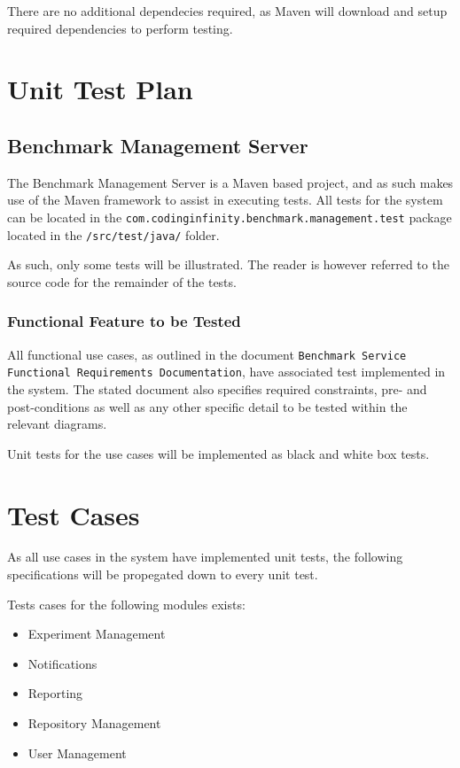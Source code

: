 \documentclass[11pt,a4paper]{article}
\begin{document}
There are no additional dependecies required, as Maven will download and setup
required dependencies to perform testing.

\section{Unit Test Plan}
\subsection{Benchmark Management Server}
\label{sec:benchmarkManagementServerUnitTestPlan}
The Benchmark Management Server is a Maven based project, and as such makes use
of the Maven framework to assist in executing tests. All tests for the system
can be located in the \texttt{com.codinginfinity.benchmark.management.test} package located
in the \texttt{/src/test/java/} folder.

As such, only some tests will be illustrated. The reader is however referred to the
source code for the remainder of the tests.

\subsubsection{Functional Feature to be Tested}
All functional use cases, as outlined in the document \texttt{Benchmark Service 
Functional Requirements Documentation}, have associated test implemented in the
system. The stated document also specifies required constraints, pre- and post-conditions
as well as any other specific detail to be tested within the relevant diagrams.

Unit tests for the use cases will be implemented as black and white box tests.

\section{Test Cases}
As all use cases in the system have implemented unit tests, the following
specifications will be propegated down to every unit test.

Tests cases for the following modules exists:
\begin{itemize}
  \item Experiment Management
  \item Notifications
  \item Reporting
  \item Repository Management
  \item User Management
\end{itemize}
\end{document}
